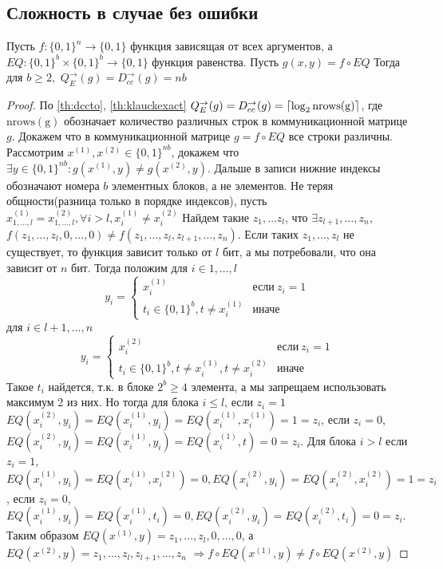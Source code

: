 \documentclass{article}
\begin{document}
\subsection{Сложность в случае без ошибки}
\label{sec:eqdet}
\begin{theorem} 
    Пусть $f: \{0, 1\}^{n} \to \{0, 1\}$ функция зависящая от всех аргументов, а $EQ: \{0, 1\}^{b} \times \{0, 1\}^{b} \to \{0, 1\}$ функция равенства. Пусть $g(x, y) = f \circ EQ$ Тогда для $b\geq 2,$
    $Q_{E}^{\to}(g) = D_{cc}^{\to}(g) = nb$
\begin{proof}
По \autoref{th:dccto}, \autoref{th:klauckexact} $Q_{E}^{\to}(g) = D_{cc}^{\to}(g) = \lceil\log_2{\operatorname{nrows(g)}}\rceil$, где $\operatorname{nrows(g)}$ обозначает количество различных строк в коммуникационной матрице $g$. Докажем что в коммуникационной матрице $g = f \circ EQ$ все строки различны. Рассмотрим  $x^{(1)}, x^{(2)} \in \{0, 1\}^{nb}$, докажем что $\exists y \in \{0, 1\}^{nb}: g(x^{(1)}, y) \neq g(x^{(2)}, y)$. Дальше в записи нижние индексы обозначают номера $b$ элементных блоков, а не элементов. Не теряя общности(разница только в порядке индексов), пусть $x^{(1)}_{1,\ldots, l} = x^{(2)}_{1, \ldots, l}, \forall i > l, x^{(1)}_{i} \neq x^{(2)}_{i}$ Найдем такие $z_1, \ldots z_l$, что $\exists z_{l+1}, \ldots, z_{n}$, $f(z_1, \ldots, z_l, 0,\ldots, 0) \neq f(z_1, \ldots, z_l, z_{l+1}, \ldots, z_{n})$. Если таких $z_1, \ldots, z_l$ не существует, то функция зависит только от $l$ бит, а мы потребовали, что она зависит от $n$ бит. Тогда положим для $i \in 1,\ldots, l$ 
$$y_i = \begin{cases}x^{(1)}_i &\textit{если}\ z_i = 1\\t_i \in \{0, 1\}^b, t \neq x^{(1)}_{i} &\textit{иначе}\end{cases}$$ 
для $i \in l + 1,\ldots, n$ 
$$y_i = \begin{cases}x^{(2)}_i &\textit{если}\ z_i = 1\\t_i \in \{0, 1\}^b, t \neq x^{(1)}_{i}, t \neq x^{(2)}_{i} &\textit{иначе}\end{cases}$$Такое $t_i$ найдется, т.к. в блоке $2^b \geq 4$ элемента, а мы запрещаем использовать максимум 2 из них.  Но тогда для блока $i \leq l$, если $z_i = 1$ $EQ(x^{(2)}_i, y_i) = EQ(x^{(1)}_i, y_i) = EQ(x^{(1)}_i, x^{(1)}_i) = 1 = z_i$, если $z_i = 0$, $EQ(x^{(2)}_i, y_i) = EQ(x^{(1)}_i, y_i) = EQ(x^{(1)}_i, t) = 0 = z_i$. Для блока $i > l$ если $z_i = 1$, $EQ(x^{(1)}_i, y_i) = EQ(x^{(1)}_i, x^{(2)}_i) = 0, EQ(x^{(2)}_i, y_i) = EQ(x^{(2)}_i, x^{(2)}_i) = 1 = z_i$, если $z_i = 0$, $EQ(x^{(1)}_i, y_i) = EQ(x^{(1)}_i, t_i) = 0, EQ(x^{(2)}_i, y_i) = EQ(x^{(2)}_i, t_i) = 0 = z_i$. Таким образом  
$EQ(x^{(1)}, y) = z_1, \ldots, z_l, 0, \ldots, 0$, а $EQ(x^{(2)}, y) = z_1, \ldots, z_l, z_{l+1}, \ldots, z_{n}$ $\Rightarrow f\circ EQ(x^{(1)}, y) \neq f \circ EQ(x^{(2)}, y)$  
\end{proof}
\end{theorem} 
\end{document}
